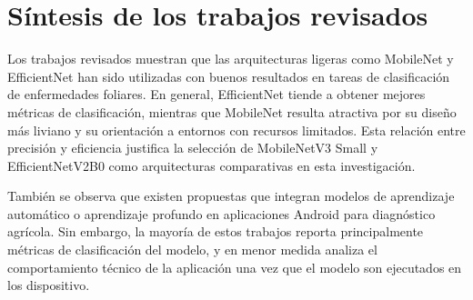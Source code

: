 \section{Síntesis de los trabajos revisados}

Los trabajos revisados muestran que las arquitecturas ligeras como MobileNet y EfficientNet han sido utilizadas con buenos resultados en
tareas de clasificación de enfermedades foliares. En general, EfficientNet tiende a obtener mejores métricas de clasificación, mientras
que MobileNet resulta atractiva por su diseño más liviano y su orientación a entornos con recursos limitados. Esta relación entre
precisión y eficiencia justifica la selección de MobileNetV3 Small y EfficientNetV2B0 como arquitecturas comparativas en esta
investigación.

También se observa que existen propuestas que integran modelos de aprendizaje automático o aprendizaje profundo en aplicaciones Android
para diagnóstico agrícola. Sin embargo, la mayoría de estos trabajos reporta principalmente métricas de clasificación del modelo, y en
menor medida analiza el comportamiento técnico de la aplicación una vez que el modelo son ejecutados en los dispositivo. 
